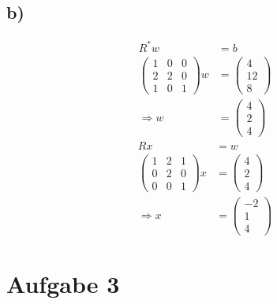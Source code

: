 \documentclass[10pt,a4paper]{article}
\begin{document}
\subsection*{b)}
\begin{align*}
    R^*w &= b\\
    \left(\begin{matrix}
        1 & 0 & 0 \\
        2 & 2 & 0 \\
        1 & 0 & 1
    \end{matrix}\right) w &=  \left(\begin{matrix}
        4 \\
        12 \\
        8
    \end{matrix}\right)\\
    \Rightarrow w &= \left(\begin{matrix}
        4 \\
        2 \\
        4
    \end{matrix}\right)
\end{align*}
\begin{align*}
    Rx &= w\\
    \left(\begin{matrix}
        1 & 2 & 1 \\
        0 & 2 & 0 \\
        0 & 0 & 1
    \end{matrix}\right) x &=  \left(\begin{matrix}
        4 \\
        2 \\
        4
    \end{matrix}\right)\\
    \Rightarrow x &= \left(\begin{matrix}
        -2 \\
        1 \\
        4
    \end{matrix}\right)
\end{align*}

\section*{Aufgabe 3}

\end{document}

